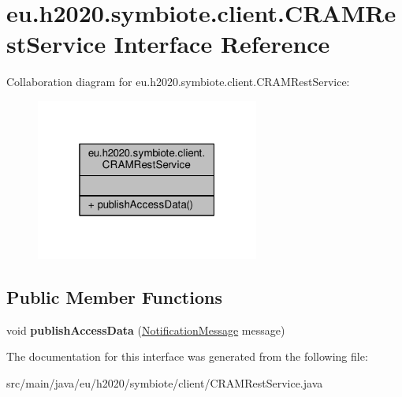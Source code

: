 \hypertarget{interfaceeu_1_1h2020_1_1symbiote_1_1client_1_1CRAMRestService}{}\section{eu.\+h2020.\+symbiote.\+client.\+C\+R\+A\+M\+Rest\+Service Interface Reference}
\label{interfaceeu_1_1h2020_1_1symbiote_1_1client_1_1CRAMRestService}


Collaboration diagram for eu.\+h2020.\+symbiote.\+client.\+C\+R\+A\+M\+Rest\+Service\+:
\nopagebreak
\begin{figure}[H]
\begin{center}
\leavevmode
\includegraphics[width=208pt]{interfaceeu_1_1h2020_1_1symbiote_1_1client_1_1CRAMRestService__coll__graph}
\end{center}
\end{figure}
\subsection*{Public Member Functions}
\begin{DoxyCompactItemize}
\item 
\mbox{\label{interfaceeu_1_1h2020_1_1symbiote_1_1client_1_1CRAMRestService_a0720287dfbf2659145f1bf615d34dad6}} 
void {\bfseries publish\+Access\+Data} (\hyperlink{classeu_1_1h2020_1_1symbiote_1_1core_1_1cci_1_1accessNotificationMessages_1_1NotificationMessage}{Notification\+Message} message)
\end{DoxyCompactItemize}


The documentation for this interface was generated from the following file\+:\begin{DoxyCompactItemize}
\item 
src/main/java/eu/h2020/symbiote/client/C\+R\+A\+M\+Rest\+Service.\+java\end{DoxyCompactItemize}
